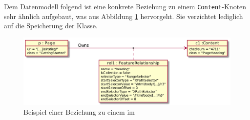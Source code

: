     Dem Datenmodell folgend ist eine konkrete Beziehung zu einem \texttt{Content}-Knoten
    sehr ähnlich aufgebaut, was aus Abbildung \ref{image:dbDataModelExampleRel1} hervorgeht.
    Sie verzichtet lediglich auf die Speicherung der Klasse.

    \begin{figure}[htb]
        \centering
        \includegraphics[scale=\imageScalingFactor]{../resources/db-data-model/example/p-c1.png}
        \caption{Beispiel einer Beziehung zu einem {\contentFeature} im {\classificationStorage}}
        \label{image:dbDataModelExampleRel1}
    \end{figure}
